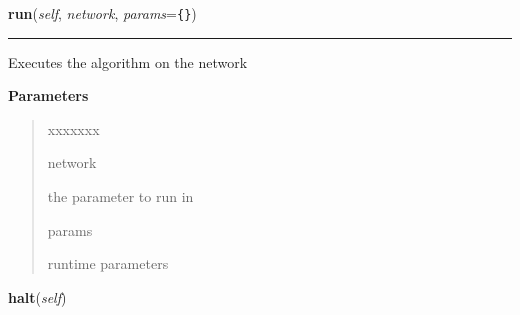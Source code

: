     \label{datk:core:distalgs:Algorithm:run}

    \vspace{0.5ex}

\hspace{.8\funcindent}\begin{boxedminipage}{\funcwidth}

    \raggedright \textbf{run}(\textit{self}, \textit{network}, \textit{params}={\tt \texttt{\{}\texttt{\}}})

    \vspace{-1.5ex}

    \rule{\textwidth}{0.5\fboxrule}
\setlength{\parskip}{2ex}
    Executes the algorithm on the network

\setlength{\parskip}{1ex}
      \textbf{Parameters}
      \vspace{-1ex}

      \begin{quote}
        \begin{Ventry}{xxxxxxx}

          \item[network]

          the parameter to run in

          \item[params]

          runtime parameters

        \end{Ventry}

      \end{quote}

    \end{boxedminipage}

    \label{datk:core:distalgs:Algorithm:halt}

    \vspace{0.5ex}

\hspace{.8\funcindent}\begin{boxedminipage}{\funcwidth}

    \raggedright \textbf{halt}(\textit{self})

\setlength{\parskip}{2ex}
\setlength{\parskip}{1ex}
    \end{boxedminipage}

